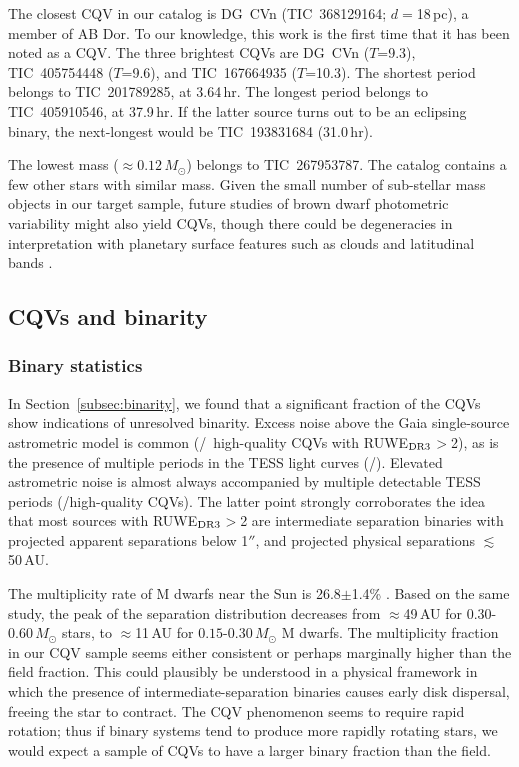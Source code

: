 \documentclass[11pt,twocolumn,tighten]{aastex63}
\begin{document}
The closest CQV in our catalog is DG~CVn (TIC~368129164;
$d$$=$18\,pc), a member of AB Dor.  To our knowledge, this work is the
first time that it has been noted as a CQV.  The three brightest CQVs
are DG~CVn ($T$=9.3), TIC~405754448 ($T$=9.6), and TIC~167664935
($T$=10.3).  The shortest period belongs to TIC~201789285, at
3.64\,hr.  The longest period belongs to TIC~405910546, at 37.9\,hr.
If the latter source turns out to be an eclipsing binary, the
next-longest would be TIC~193831684 (31.0\,hr).

The lowest mass ($\approx$$0.12$\,$M_\odot$) belongs to TIC~267953787.
The catalog contains a few other stars with similar mass.  Given the
small number of sub-stellar mass objects in our target sample, future
studies of brown dwarf photometric variability might also yield CQVs,
though there could be degeneracies in interpretation with planetary
surface features such as clouds and latitudinal bands
\citep[e.g.][]{2021ApJ...906...64A,2022ApJ...924...68V}.


\subsection{CQVs and binarity}
\label{subsec:discbinary}

\subsubsection{Binary statistics}

In Section~\ref{subsec:binarity}, we found that a significant fraction
of the CQVs show indications of unresolved binarity.  Excess noise
above the Gaia single-source astrometric model is common
(\ngoodhighruwe/\ngoods\ high-quality CQVs with RUWE$_{\rm DR3}$$>$2),
as is the presence of multiple periods in the TESS light curves
(\ngoodmultperiodflag/\ngoods).  Elevated astrometric noise is almost
always accompanied by multiple detectable TESS periods
(\ngoodruweandmultperiod/\ngoodhighruwe high-quality CQVs).  The
latter point strongly corroborates the idea that most sources with
RUWE$_{\rm DR3}$$>$2 are intermediate separation binaries with
projected apparent separations below 1$''$, and projected physical
separations $\lesssim$50\,AU.

The multiplicity rate of M dwarfs near the Sun is 26.8$\pm$1.4\%
\citep{2019AJ....157..216W}.  Based on the same study, the peak of the
separation distribution decreases from $\approx$49\,AU for
$0.30$-$0.60$\,$M_\odot$ stars, to $\approx$11\,AU for
$0.15$-$0.30$\,$M_\odot$ M dwarfs.  The multiplicity fraction in our
CQV sample seems either consistent or perhaps marginally higher than
the field fraction.  This could plausibly be understood in a physical
framework in which the presence of intermediate-separation binaries
causes early disk dispersal, freeing the star to contract.  The CQV
phenomenon seems to require rapid rotation; thus if binary systems
tend to produce more rapidly rotating stars, we would expect a sample
of CQVs to have a larger binary fraction than the field.
\end{document}
